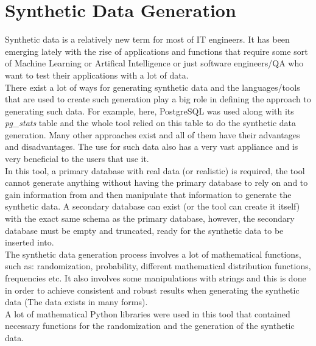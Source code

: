 \section{Synthetic Data Generation}
Synthetic data is a relatively new term for most of IT engineers. It has been emerging lately with the rise of applications and functions that require some sort of Machine Learning or Artifical Intelligence or just software engineers/QA who want to test their applications with a lot of data.\\
\newline
There exist a lot of ways for generating synthetic data and the languages/tools that are used to create such generation play a big role in defining the approach to generating such data. For example, here, PostgreSQL was used along with its \textit{pg\_stats} table and the whole tool relied on this table to do the synthetic data generation. Many other approaches exist and all of them have their advantages and disadvantages. The use for such data also has a very vast appliance and is very beneficial to the users that use it.\\
\newline
In this tool, a primary database with real data (or realistic) is required, the tool cannot generate anything without having the primary database to rely on and to gain information from and then manipulate that information to generate the synthetic data. A secondary database can exist (or the tool can create it itself) with the exact same schema as the primary database, however, the secondary database must be empty and truncated, ready for the synthetic data to be inserted into.\\
\newline
The synthetic data generation process involves a lot of mathematical functions, such as: randomization, probability, different mathematical distribution functions, frequencies etc. It also involves some manipulations with strings and this is done in order to achieve consistent and robust results when generating the synthetic data (The data exists in many forms).\\
A lot of mathematical Python libraries were used in this tool that contained necessary functions for the randomization and the generation of the synthetic data.
